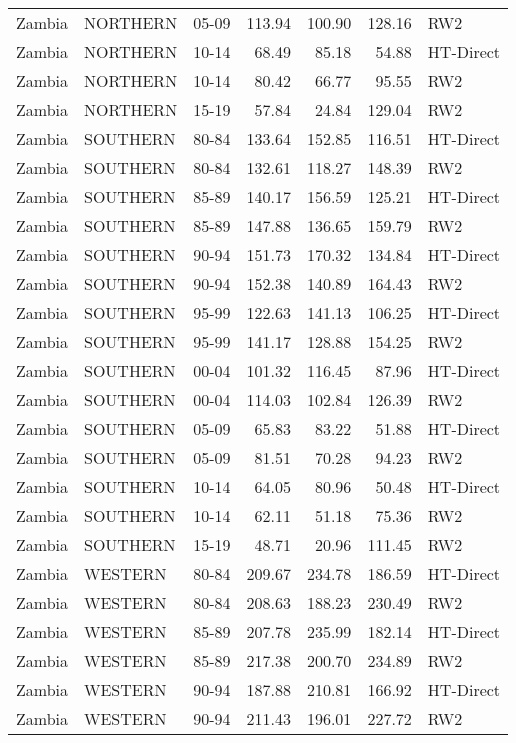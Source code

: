 \begin{longtable}{lllrrrl}
  Zambia & NORTHERN & 05-09 & 113.94 & 100.90 & 128.16 & RW2 \\ 
  Zambia & NORTHERN & 10-14 & 68.49 & 85.18 & 54.88 & HT-Direct \\ 
  Zambia & NORTHERN & 10-14 & 80.42 & 66.77 & 95.55 & RW2 \\ 
  Zambia & NORTHERN & 15-19 & 57.84 & 24.84 & 129.04 & RW2 \\ 
  Zambia & SOUTHERN & 80-84 & 133.64 & 152.85 & 116.51 & HT-Direct \\ 
  Zambia & SOUTHERN & 80-84 & 132.61 & 118.27 & 148.39 & RW2 \\ 
  Zambia & SOUTHERN & 85-89 & 140.17 & 156.59 & 125.21 & HT-Direct \\ 
  Zambia & SOUTHERN & 85-89 & 147.88 & 136.65 & 159.79 & RW2 \\ 
  Zambia & SOUTHERN & 90-94 & 151.73 & 170.32 & 134.84 & HT-Direct \\ 
  Zambia & SOUTHERN & 90-94 & 152.38 & 140.89 & 164.43 & RW2 \\ 
  Zambia & SOUTHERN & 95-99 & 122.63 & 141.13 & 106.25 & HT-Direct \\ 
  Zambia & SOUTHERN & 95-99 & 141.17 & 128.88 & 154.25 & RW2 \\ 
  Zambia & SOUTHERN & 00-04 & 101.32 & 116.45 & 87.96 & HT-Direct \\ 
  Zambia & SOUTHERN & 00-04 & 114.03 & 102.84 & 126.39 & RW2 \\ 
  Zambia & SOUTHERN & 05-09 & 65.83 & 83.22 & 51.88 & HT-Direct \\ 
  Zambia & SOUTHERN & 05-09 & 81.51 & 70.28 & 94.23 & RW2 \\ 
  Zambia & SOUTHERN & 10-14 & 64.05 & 80.96 & 50.48 & HT-Direct \\ 
  Zambia & SOUTHERN & 10-14 & 62.11 & 51.18 & 75.36 & RW2 \\ 
  Zambia & SOUTHERN & 15-19 & 48.71 & 20.96 & 111.45 & RW2 \\ 
  Zambia & WESTERN & 80-84 & 209.67 & 234.78 & 186.59 & HT-Direct \\ 
  Zambia & WESTERN & 80-84 & 208.63 & 188.23 & 230.49 & RW2 \\ 
  Zambia & WESTERN & 85-89 & 207.78 & 235.99 & 182.14 & HT-Direct \\ 
  Zambia & WESTERN & 85-89 & 217.38 & 200.70 & 234.89 & RW2 \\ 
  Zambia & WESTERN & 90-94 & 187.88 & 210.81 & 166.92 & HT-Direct \\ 
  Zambia & WESTERN & 90-94 & 211.43 & 196.01 & 227.72 & RW2 \\ 

\end{longtable}
